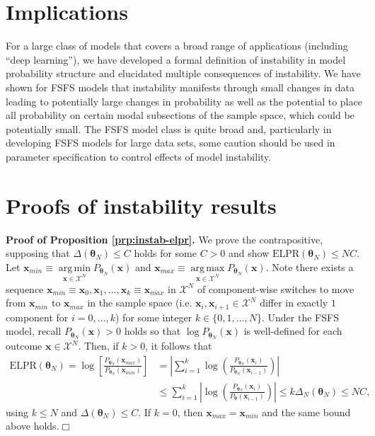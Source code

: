 \documentclass[12pt]{article}
\theoremstyle{definition}
\DeclareMathOperator*{\argmin}{arg\,min}
\DeclareMathOperator*{\argmax}{arg\,max}
\begin{document}
\section{Implications}\label{implications}

For a large class of models that covers a broad range of applications
(including ``deep learning''), we have developed a formal definition of
instability in model probability structure and elucidated multiple
consequences of instability. We have shown for FSFS models that
instability manifests through small changes in data leading to
potentially large changes in probability as well as the potential to
place all probability on certain modal subsections of the sample space,
which could be potentially small. The FSFS model class is quite broad
and, particularly in developing FSFS models for large data sets, some
caution should be used in parameter specification to control effects of
model instability.

\clearpage

\appendix


\section{Proofs of instability results}\label{appendix-instab}

\textbf{Proof of Proposition \ref{prp:instab-elpr}.} We prove the
contrapositive, supposing that \(\Delta(\boldsymbol \theta_N) \le C\)
holds for some \(C > 0\) and show
\(\text{ELPR}(\boldsymbol \theta_N) \leq NC\). Let
\(\boldsymbol x_{min} \equiv \argmin\limits_{\boldsymbol x \in \mathcal{X}^N}P_{\boldsymbol \theta_N}(\boldsymbol x)\)
and
\(\boldsymbol x_{max} \equiv \argmax\limits_{\boldsymbol x \in \mathcal{X}^N}P_{\boldsymbol \theta_N}(\boldsymbol x)\).
Note there exists a sequence
\(\boldsymbol x_{min} \equiv \boldsymbol x_0, \boldsymbol x_1, \dots, \boldsymbol x_k \equiv \boldsymbol x_{max}\)
in \(\mathcal{X}^N\) of component-wise switches to move from
\(\boldsymbol x_{min}\) to \(\boldsymbol x_{max}\) in the sample space
(i.e. \(\boldsymbol x_i, \boldsymbol x_{i + 1} \in \mathcal{X}^N\)
differ in exactly \(1\) component for \(i = 0, \dots, k\)) for some
integer \(k \in \{0, 1, \dots, N\}\). Under the FSFS model, recall
\(P_{\boldsymbol \theta_N}(\boldsymbol x) > 0\) holds so that
\(\log P_{\boldsymbol \theta_N}(\boldsymbol x)\) is well-defined for
each outcome \(\boldsymbol x \in \mathcal{X}^N\). Then, if \(k > 0\), it
follows that
\begin{align*}
\text{ELPR}(\boldsymbol \theta_N) = \log\left[\frac{P_{\boldsymbol \theta_N}(\boldsymbol x_{max})}{P_{\boldsymbol \theta_N}(\boldsymbol x_{min})}\right] &= \left|\sum\limits_{i = 1}^k\log\left(\frac{P_{\boldsymbol \theta_N}(\boldsymbol x_i)}{P_{\boldsymbol \theta_N}(\boldsymbol x_{i-1})}\right)\right| \\
&\le \sum\limits_{i = 1}^k\left|\log\left(\frac{P_{\boldsymbol \theta_N}(\boldsymbol x_i)}{P_{\boldsymbol \theta}(\boldsymbol x_{i-1})}\right)\right| \le k \Delta_N(\boldsymbol \theta_N) \le NC,
\end{align*}
using \(k \le N\) and \(\Delta(\boldsymbol \theta_N) \le C\). If
\(k = 0\), then \(\boldsymbol x_{max} = \boldsymbol x_{min}\) and the
same bound above holds.\hfill \(\Box\)
\end{document}
